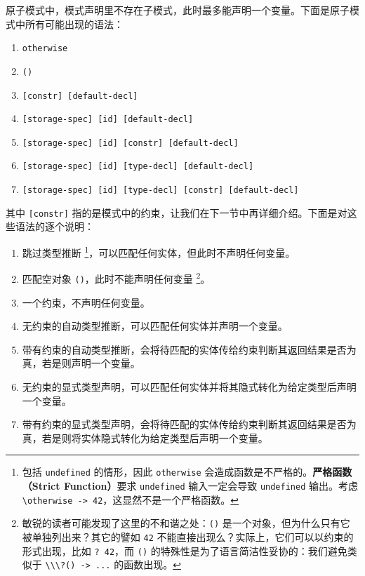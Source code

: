原子模式中，模式声明里不存在子模式，此时最多能声明一个变量。下面是原子模式中所有可能出现的语法：

\begin{grammar} \label{grm:atomic-pattern}
\begin{enumerate}
    \item \lstinline!otherwise!
    \item \texttt{()}
    \item \texttt{[constr] [default-decl]}
    \item \texttt{[storage-spec] [id] [default-decl]}
    \item \texttt{[storage-spec] [id] [constr] [default-decl]}
    \item \texttt{[storage-spec] [id] [type-decl] [default-decl]}
    \item \texttt{[storage-spec] [id] [type-decl] [constr] [default-decl]}
\end{enumerate}
\end{grammar}

其中 \lstinline![constr]! 指的是模式中的约束，让我们在下一节中再详细介绍。下面是对这些语法的逐个说明：

\begin{enumerate}
    \item 跳过类型推断 \footnote{包括 \lstinline!undefined! 的情形，因此 \lstinline!otherwise! 会造成函数是不严格的。\textbf{严格函数（Strict Function）}要求 \lstinline!undefined! 输入一定会导致 \lstinline!undefined! 输出。考虑 \lstinline!\otherwise -> 42!，这显然不是一个严格函数。}，可以匹配任何实体，但此时不声明任何变量。
    \item 匹配空对象 \lstinline!()!，此时不能声明任何变量 \footnote{敏锐的读者可能发现了这里的不和谐之处：\lstinline!()! 是一个对象，但为什么只有它被单独列出来？其它的譬如 \lstinline!42! 不能直接出现么？实际上，它们可以以约束的形式出现，比如 \lstinline!? 42!，而 \lstinline!()! 的特殊性是为了语言简洁性妥协的：我们避免类似于 \lstinline!\\\?() -> ...! 的函数出现。}。
    \item 一个约束，不声明任何变量。
    \item 无约束的自动类型推断，可以匹配任何实体并声明一个变量。
    \item 带有约束的自动类型推断，会将待匹配的实体传给约束判断其返回结果是否为真，若是则声明一个变量。
    \item 无约束的显式类型声明，可以匹配任何实体并将其隐式转化为给定类型后声明一个变量。
    \item 带有约束的显式类型声明，会将待匹配的实体传给约束判断其返回结果是否为真，若是则将实体隐式转化为给定类型后声明一个变量。
\end{enumerate}

